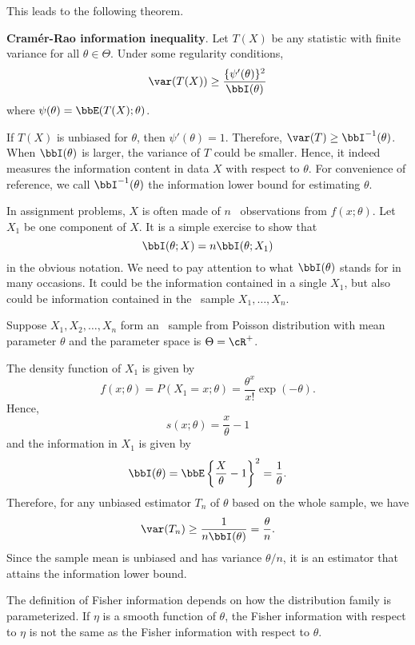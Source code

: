 This leads to the following theorem.

\begin{theorem}
{\bf Cram\'er-Rao information inequality}.
Let $T(X)$ be any statistic with finite variance for all $\theta \in \Theta$.
Under some regularity conditions,
\[
\var(T(X)) \geq \frac{\{\psi'(\theta)\}^2}{\bbI(\theta)}
\]
where $\psi(\theta) = \bbE(T(X); \theta)$.
\end{theorem}

If $T(X)$ is unbiased for $\theta$, then $\psi'(\theta) = 1$.
Therefore, $\var(T) \geq \bbI^{-1}(\theta)$.
When $\bbI(\theta)$ is larger, the variance of $T$ could be
smaller. Hence, it indeed measures the information content
in data $X$ with respect to $\theta$. For convenience of
reference, we call $\bbI^{-1}(\theta)$ the information lower
bound for estimating $\theta$.

In assignment problems, $X$ is often made of $n$ \iid\ observations
from $f(x; \theta)$. Let $X_1$ be one component of $X$.
It is a simple exercise to show that
\[
\bbI(\theta; X) = n \bbI(\theta; X_1)
\]
in the obvious notation. We need to pay attention to
what $\bbI(\theta)$ stands for in many occasions. It
could be the information contained in a single $X_1$,
but also could be information contained in the \iid\
sample $X_1, \ldots, X_n$. 

\begin{example}
Suppose $X_1, X_2, \ldots, X_n$ form an \iid\ sample from
Poisson distribution with mean parameter $\theta$
and the parameter space is $\Theta = \cR^+$. 

The density function of $X_1$ is given by
\[
f(x; \theta) = P(X_1 = x; \theta) 
= \frac{\theta^x}{x!} \exp( - \theta).
\]
Hence, 
\[
s(x; \theta) = \frac{x}{\theta} - 1
\]
and the information in $X_1$ is given by
\[
\bbI(\theta) = \bbE \left \{ \frac{X}{\theta} - 1 \right \}^2 = \frac{1}{\theta}.
\]
Therefore, for any unbiased estimator $T_n$ of $\theta$
based on the whole sample, we have
\[
\var (T_n) \geq \frac{1}{n\bbI(\theta)} = \frac{\theta}{n}.
\]
Since the sample mean is unbiased and has variance $\theta/n$,
it is an estimator that attains the information lower bound.
\end{example}

The definition of Fisher information depends on how the distribution
family is parameterized. If $\eta$ is a smooth function of $\theta$,
the Fisher information with respect to $\eta$ is not the same as
the Fisher information with respect to $\theta$. 

